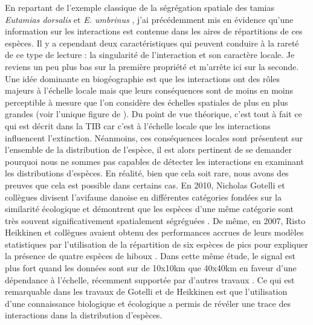 En repartant de l'exemple classique de la ségrégation spatiale des
tamias \emph{Eutamias dorsalis} et \emph{E. umbrinus} \citep{Brown1971},
j'ai précédemment mis en évidence qu'une information sur les
interactions est contenue dans les aires de répartitions de ces espèces.
Il y a cependant deux caractéristiques qui peuvent conduire à la rareté
de ce type de lecture : la singularité de l'interaction et son caractère
locale. Je reviens un peu plus bas sur la première propriété et m'arrête
ici sur la seconde. Une idée dominante en biogéographie est que les
interactions ont des rôles majeurs à l'échelle locale mais que leurs
conséquences sont de moins en moins perceptible à mesure que l'on
considère des échelles spatiales de plus en plus grandes (voir l'unique
figure de \citet{McGill2010}). Du point de vue théorique, c'est tout à
fait ce qui est décrit dans la TIB car c'est à l'échelle locale que les
interactions influencent l'extinction. Néanmoins, ces conséquences
locales sont présentent sur l'ensemble de la distribution de l'espèce,
il est alors pertinent de se demander pourquoi nous ne sommes pas
capables de détecter les interactions en examinant les distributions
d'espèces. En réalité, bien que cela soit rare, nous avons des preuves
que cela est possible dans certains cas. En 2010, Nicholas Gotelli et
collègues divisent l'avifaune danoise en différentes catégories fondées
sur la similarité écologique et démontrent que les espèces d'une même
catégorie sont très souvent significativement spatialement ségréguées
\citep{Gotelli2010}. De même, en 2007, Risto Heikkinen et collègues
avaient obtenu des performances accrues de leurs modèles statistiques
par l'utilisation de la répartition de six espèces de pics pour
expliquer la présence de quatre espèces de hiboux \citep{Heikkinen2007}.
Dans cette même étude, le signal est plus fort quand les données sont
sur de 10x10km que 40x40km en faveur d'une dépendance à l'échelle,
récemment supportée par d'autres travaux \citep{Belmaker2015}. Ce qui
est remarquable dans les travaux de Gotelli et de Heikkinen est que
l'utilisation d'une connaissance biologique et écologique a permis de
révéler une trace des interactions dans la distribution d'espèces.

